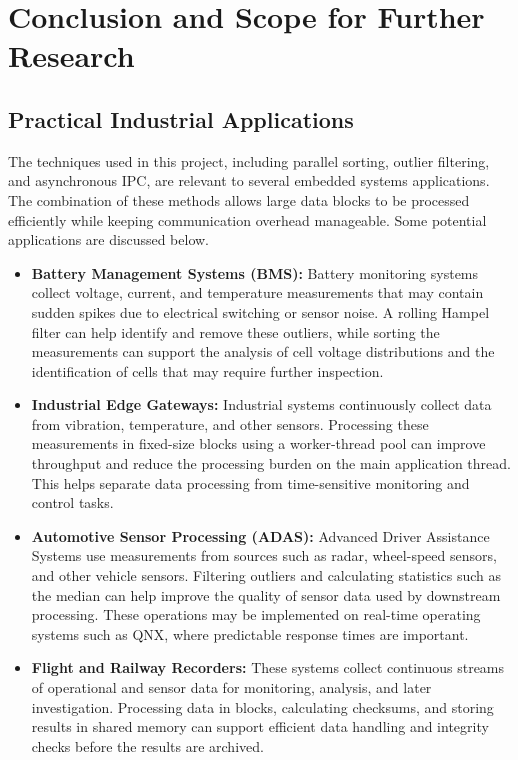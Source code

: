 \documentclass[12pt,a4paper,oneside]{report}
\begin{document}
\chapter{Conclusion and Scope for Further Research}

\section{Practical Industrial Applications}
\label{sec:applications}

The techniques used in this project, including parallel sorting, outlier filtering, and asynchronous IPC, are relevant to several embedded systems applications. The combination of these methods allows large data blocks to be processed efficiently while keeping communication overhead manageable. Some potential applications are discussed below.

\begin{itemize}
    \item \textbf{Battery Management Systems (BMS):} Battery monitoring systems collect voltage, current, and temperature measurements that may contain sudden spikes due to electrical switching or sensor noise. A rolling Hampel filter can help identify and remove these outliers, while sorting the measurements can support the analysis of cell voltage distributions and the identification of cells that may require further inspection.

    \item \textbf{Industrial Edge Gateways:} Industrial systems continuously collect data from vibration, temperature, and other sensors. Processing these measurements in fixed-size blocks using a worker-thread pool can improve throughput and reduce the processing burden on the main application thread. This helps separate data processing from time-sensitive monitoring and control tasks.

    \item \textbf{Automotive Sensor Processing (ADAS):} Advanced Driver Assistance Systems use measurements from sources such as radar, wheel-speed sensors, and other vehicle sensors. Filtering outliers and calculating statistics such as the median can help improve the quality of sensor data used by downstream processing. These operations may be implemented on real-time operating systems such as QNX, where predictable response times are important.

    \item \textbf{Flight and Railway Recorders:} These systems collect continuous streams of operational and sensor data for monitoring, analysis, and later investigation. Processing data in blocks, calculating checksums, and storing results in shared memory can support efficient data handling and integrity checks before the results are archived.
\end{itemize}
\end{document}
